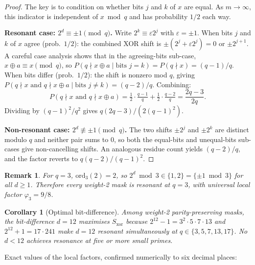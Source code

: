 \documentclass[12pt]{article}
\newtheorem{corollary}[theorem]{Corollary}
\newtheorem{remark}{Remark}
\newcommand{\ord}{\mathrm{ord}}
\begin{document}
\begin{proof}
The key is to condition on whether bits $j$ and $k$ of $x$ are equal.
As $m \to \infty$, this indicator is independent of $x \bmod q$ and
has probability $1/2$ each way.

\smallskip\noindent
\textbf{Resonant case: $2^d \equiv \pm1 \pmod{q}$.}
Write $2^k \equiv \varepsilon 2^j$ with $\varepsilon = \pm 1$.
When bits $j$ and $k$ of $x$ agree (prob.~$1/2$):
the combined XOR shift is $\pm(2^j + \varepsilon 2^j) = 0$ or $\pm 2^{j+1}$.
A careful case analysis shows that in the agreeing-bits sub-case,
$x \oplus a \equiv x \pmod{q}$, so
$P(q \nmid x \oplus a \mid \text{bits } j{=}k) = P(q \nmid x) = (q-1)/q$.
When bits differ (prob.~$1/2$):
the shift is nonzero mod $q$, giving
$P(q \nmid x \text{ and } q \nmid x \oplus a \mid \text{bits } j{\neq}k) = (q-2)/q$.
Combining:
\[
  P(q \nmid x \text{ and } q \nmid x \oplus a)
  = \tfrac{1}{2}\cdot\tfrac{q-1}{q} + \tfrac{1}{2}\cdot\tfrac{q-2}{q}
  = \frac{2q-3}{2q}.
\]
Dividing by $(q-1)^2/q^2$ gives $q(2q-3)/(2(q-1)^2)$.

\smallskip\noindent
\textbf{Non-resonant case: $2^d \not\equiv \pm1 \pmod{q}$.}
The two shifts $\pm2^j$ and $\pm2^k$ are distinct modulo $q$
and neither pair sums to $0$, so both the equal-bits and unequal-bits
sub-cases give non-cancelling shifts.
An analogous residue count yields $(q-2)/q$,
and the factor reverts to $q(q-2)/(q-1)^2$.
\end{proof}

\begin{remark}
For $q = 3$, $\ord_3(2) = 2$, so $2^d \bmod 3 \in \{1, 2\} = \{\pm 1 \bmod 3\}$
for all $d \geq 1$.  Therefore \emph{every} weight-2 mask is resonant at $q=3$,
with universal local factor $\varphi_3 = 9/8$.
\end{remark}

\begin{corollary}[Optimal bit-difference]
\label{cor:optd}
Among weight-2 parity-preserving masks, the bit-difference $d = 12$
maximises $S_{\mathrm{xor}}$ because $2^{12}-1 = 3^2 \cdot 5 \cdot 7 \cdot 13$
and $2^{12}+1 = 17 \cdot 241$
make $d=12$ resonant simultaneously at $q \in \{3, 5, 7, 13, 17\}$.
No $d < 12$ achieves resonance at five or more small primes.
\end{corollary}

\noindent
Exact values of the local factors, confirmed numerically to six decimal places:
\end{document}
